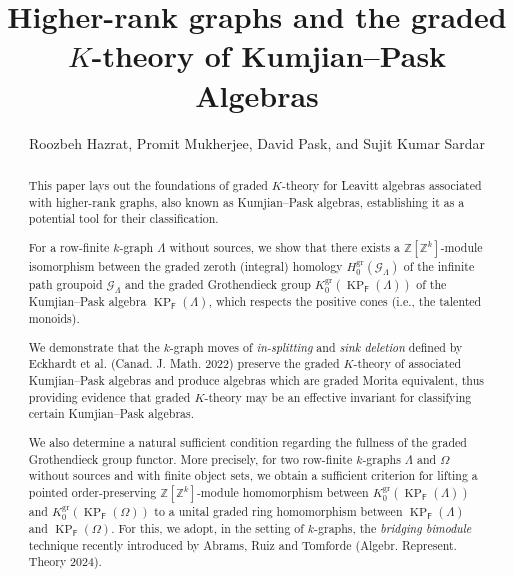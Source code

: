 \documentclass[12pt]{amsart}
\newcommand{\KP}{\operatorname{KP}}
\theoremstyle{definition}
\theoremstyle{remark}
\newcommand{\gr}{\operatorname{gr}}
\begin{document}
\title{Higher-rank graphs and the graded $K$-theory of Kumjian--Pask Algebras}

\author[Hazrat, Mukherjee, Pask and Sardar]{{ Roozbeh Hazrat, } { Promit Mukherjee, } { David Pask, } and { Sujit Kumar Sardar}}
\address{ (R. Hazrat) Centre for Research in Mathematics and Data Science, Western Sydney University,  NSW 2150, Australia}
\address{ (P. Mukherjee) Department of Mathematics, Jadavpur University, Kolkata-700032, India}
\address{ (D. Pask) School of Mathematics and Applied Statistics, University of Wollongong,  NSW 2522, Australia}
\address{ (S. K. Sardar) Department of Mathematics, Jadavpur University, Kolkata-700032, India}




\begin{abstract}
This paper lays out the foundations of graded $K$-theory for Leavitt algebras associated with higher-rank graphs, also known as Kumjian--Pask algebras, establishing it as a potential tool for their classification. 

For a row-finite $k$-graph $\Lambda$ without sources, we show that there exists a $\mathbb{Z}[\mathbb{Z}^k]$-module isomorphism between the graded zeroth (integral) homology $H_0^{\gr}(\mathcal{G}_\Lambda)$ of the infinite path groupoid $\mathcal{G}_\Lambda$ and the graded Grothendieck group $K_0^{\gr}(\KP_\mathsf{F}(\Lambda))$ of the Kumjian--Pask algebra $\KP_\mathsf{F}(\Lambda)$, which respects the positive cones (i.e., the talented monoids).  


We demonstrate that the $k$-graph moves of \emph{in-splitting} and \emph{sink deletion} defined by Eckhardt et al. (Canad. J. Math. 2022) preserve the graded $K$-theory of associated Kumjian--Pask algebras and produce algebras which are graded Morita equivalent, thus providing evidence that graded $K$-theory may be an effective invariant for classifying certain Kumjian--Pask algebras.

We also determine a natural sufficient condition regarding the fullness of the graded Grothendieck group functor. More precisely, for two row-finite $k$-graphs $\Lambda$ and $\Omega$ without sources and with finite object sets, we obtain a sufficient criterion for lifting a pointed order-preserving $\mathbb{Z}[\mathbb{Z}^k]$-module homomorphism between $K_0^{\gr}(\KP_\mathsf{F}(\Lambda))$ and $K_0^{\gr}(\KP_\mathsf{F}(\Omega))$ to a unital graded ring homomorphism between $\KP_\mathsf{F}(\Lambda)$ and $\KP_\mathsf{F}(\Omega)$. For this, we adopt, in the setting of $k$-graphs, the \emph{bridging bimodule} technique recently introduced by Abrams, Ruiz and Tomforde (Algebr. Represent. Theory 2024).  
\end{abstract}
\end{document}
